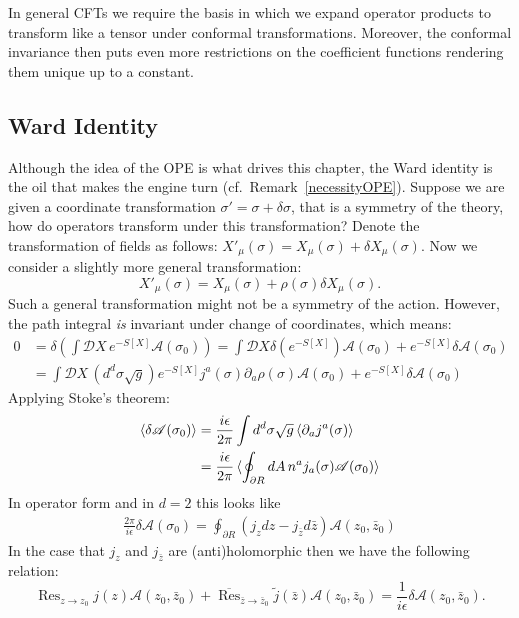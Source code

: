 \documentclass{report}
\theoremstyle{plain}
\theoremstyle{definition}
\theoremstyle{remark}
\newcommand{\FR}[2]{\frac{#1}{#2}}
\newcommand{\mc}{\mathcal}
\newcommand{\ms}{\mathscr}
\newcommand{\sg}{\sigma}
\newcommand{\di}{\partial}
\DeclareMathOperator{\Res}{Res}
\begin{document}
In general CFTs we require the basis in which we expand operator products
to transform like a tensor under conformal transformations. Moreover, the
conformal invariance then puts even more restrictions on the coefficient
functions rendering them unique up to a constant.  

\subsection{Ward Identity}
Although the idea of the OPE is what drives this chapter, the Ward identity
is the oil that makes the engine turn (cf.~Remark~\ref{necessityOPE}). Suppose we
are given a coordinate transformation $\sg' = \sg+\delta\sg$, that is a
symmetry of the theory, how do operators transform under this
transformation? Denote the transformation of fields as follows:
$X'_\mu(\sg) = X_\mu(\sg) + \delta X_\mu(\sg)$. Now we consider a slightly
more general transformation: 
\[ X'_\mu(\sg) = X_\mu(\sg)+\rho(\sg)\delta X_\mu(\sg).\] 
Such a general transformation might not be a symmetry of the action.
However, the path integral \emph{is} invariant under change of coordinates,
which means:
\begin{align*}
0 &= \delta\left( \int \mc DX\, e^{-S[X]}\ms A(\sg_0) \right)
=\int\mc DX\delta (e^{-S[X]})\ms A(\sg_0)+e^{-S[X]}\delta\ms A(\sg_0)\\
&=\int\mc DX\,(d^d\sg\sqrt{g}) e^{-S[X]} j^a(\sg)\di_a\rho(\sg)\ms
A(\sg_0)+e^{-S[X]}\delta\ms A(\sg_0)
\end{align*}
Applying Stoke's theorem:
\begin{align*}
\braket{\delta \ms A(\sg_0)} &= \FR{i\epsilon}{2\pi} \int d^d\sg
\sqrt{g} \braket{\di_aj^a(\sg)}\\
&= \FR{i\epsilon}{2\pi} \braket{ \oint_{\di R} dA\,n^aj_a(\sg)\ms A(\sg_0)}
\end{align*}
In operator form and in $d=2$ this looks like
\begin{align}
    \FR{2\pi}{i\epsilon}\delta \ms A(\sg_0)
=\oint_{\di R} (j_zdz - j_{\bar z}d\bar z) \ms A(z_0,\bar z_0)
    \label{conformalWard}
\end{align}
In the case that $j_z$ and $j_{\bar z}$ are (anti)holomorphic then we have
the following relation:
\[\Res_{z\to z_0} j(z)\ms A(z_0,\bar z_0) + \overline{\Res}_{\bar z\to\bar
z_0} \tilde j(\bar z)\ms A(z_0,\bar z_0) = \FR{1}{i\epsilon}\delta\ms
A(z_0,\bar z_0).\]
\end{document}
